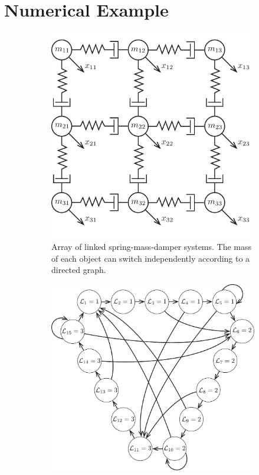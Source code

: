 \section{Numerical Example}
\begin{figure}
	\centering
	\begin{subfigure}[t]{0.45\columnwidth}
		\centering
		\includegraphics[width=\textwidth]{./figures/num_ex_sys}
		\caption{Array of linked spring-mass-damper systems. The mass of each object can switch independently according to a directed graph.}
		\label{fig:num_ex_sys}
	\end{subfigure}
	\hfill
	\begin{subfigure}[t]{0.45\columnwidth}
		\centering
		\includegraphics[width=\textwidth]{./figures/num_ex_graph}

\end{subfigure}
\end{figure}
